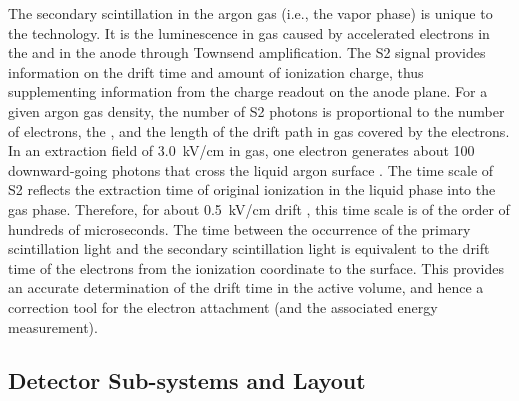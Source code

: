 The secondary scintillation in the argon gas (i.e., the vapor phase) is unique to the \dpmod technology. It is the luminescence in gas caused by accelerated electrons in the \efield and in the  anode through Townsend amplification. The S2 signal provides information on the drift time and amount of ionization charge, thus supplementing information from the charge readout on the anode plane. For a given argon gas density, the number of S2 photons is proportional to the number of electrons, the \efield, and the length of the drift path in gas covered by the electrons. In an extraction field of \SI{3.0}{kV/cm} in gas, one electron generates about \num{100} downward-going photons that cross the liquid argon surface \cite{Lux:2018zwd}. The time scale of S2 reflects the extraction time of original ionization in the liquid phase into the gas phase. Therefore, for about \SI{0.5}{kV/cm} drift \efield, this time scale is of the order of hundreds of microseconds. The time between the occurrence of the primary scintillation light and the secondary scintillation light is equivalent to the drift time of the electrons from the ionization coordinate to the \lar surface. This provides an accurate determination of the drift time in the active volume, and hence a correction tool for the electron attachment (and the associated energy measurement).  



\subsection{Detector Sub-systems and Layout}
\label{sec:dp-pds-overview_layout}

